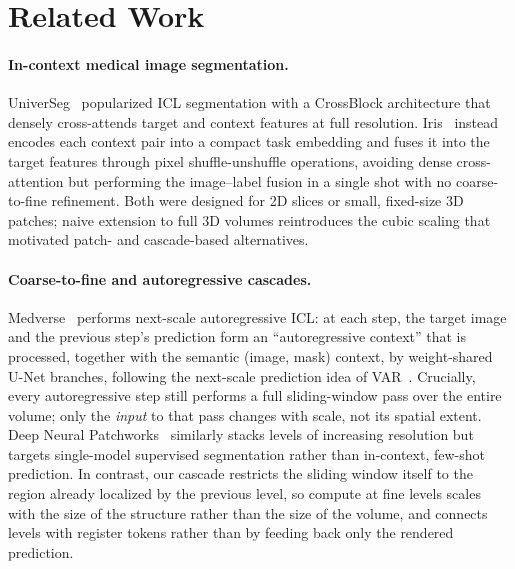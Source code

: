 \section{Related Work}
\label{sec:related}

\paragraph{In-context medical image segmentation.}
UniverSeg~\cite{butoiUniverSegUniversalMedical2023} popularized ICL
segmentation with a CrossBlock architecture that densely cross-attends
target and context features at full resolution. Iris~\cite{gaoShowSegmentUniversal2025}
instead encodes each context pair into a compact task embedding and
fuses it into the target features through pixel shuffle-unshuffle
operations, avoiding dense cross-attention but performing the
image--label fusion in a single shot with no coarse-to-fine refinement.
Both were designed for 2D slices or small, fixed-size 3D patches; naive
extension to full 3D volumes reintroduces the cubic scaling that
motivated patch- and cascade-based alternatives.

\paragraph{Coarse-to-fine and autoregressive cascades.}
Medverse~\cite{huMedverseUniversalModel2025a} performs next-scale
autoregressive ICL: at each step, the target image and the previous
step's prediction form an ``autoregressive context'' that is processed,
together with the semantic (image, mask) context, by weight-shared U-Net
branches, following the next-scale prediction idea of
VAR~\cite{tian2024visual}. Crucially, every autoregressive step still
performs a full sliding-window pass over the entire volume; only the
\emph{input} to that pass changes with scale, not its spatial extent.
Deep Neural Patchworks~\cite{reisertDeepNeuralPatchworks2022a} similarly
stacks levels of increasing resolution but targets single-model
supervised segmentation rather than in-context, few-shot prediction. In
contrast, our cascade restricts the sliding window itself to the region
already localized by the previous level, so compute at fine levels
scales with the size of the structure rather than the size of the
volume, and connects levels with register tokens rather than by feeding
back only the rendered prediction.

